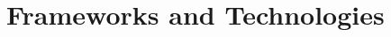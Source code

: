 \documentclass[ twoside,openright,titlepage,numbers=noenddot,headinclude,%
                footinclude=true,cleardoublepage=empty,abstractoff, %
                BCOR=5mm,paper=a4,fontsize=11pt,%
                ngerman,american,%
                ]{scrreprt}
\begin{document}
%
%
%

\section{Frameworks and Technologies}
\label{sec:fram-techn}



\end{document}

